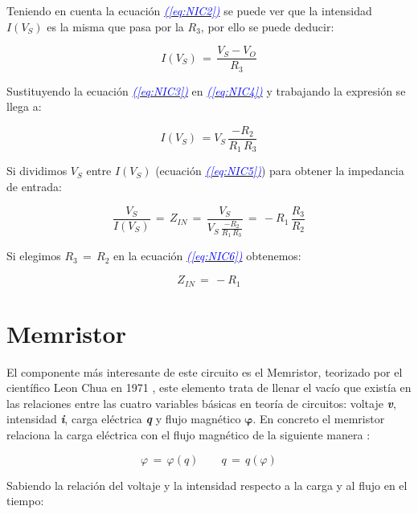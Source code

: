 \documentclass[12pt,a4paper]{report} %
\newcommand{\eref}[1]{\hyperref[#1]{\textcolor{blue}{\textit{(\ref*{#1})}}}}
\begin{document}
	Teniendo en cuenta la ecuación \eref{eq:NIC2} se puede ver que la intensidad $I(V_S)$ es la misma que pasa por la $R_3$, por ello se puede deducir:
	
	\begin{equation}
		I(V_S)\,=\,\frac{V_S - V_O}{R_3}
		\label{eq:NIC4}
	\end{equation}\smallskip
	
	Sustituyendo la ecuación \eref{eq:NIC3} en \eref{eq:NIC4} y trabajando la expresión se llega a:
	
	\begin{equation}
		I(V_S)\,=V_S\,\frac{-R_2}{R_1 \, R_3}
		\label{eq:NIC5}
	\end{equation}\smallskip
	
	Si dividimos $V_S$ entre $I(V_S)$ (ecuación \eref{eq:NIC5}) para obtener la impedancia de entrada:
	
	\begin{equation}
		\frac{V_S}{I(V_S)}\,=\,Z_{IN}\,=\,\frac{V_S}{V_S\,\frac{-R_2}{R_1 \, R_3}}\,=\,-R_1\,\frac{R_3}{R_2}
		\label{eq:NIC6}
	\end{equation}\smallskip
	
	Si elegimos $R_3\,=\,R_2$ en la ecuación \eref{eq:NIC6} obtenemos:
	
	\begin{equation}
		Z_{IN}\,=\,-R_1
		\label{eq:NIC7}
	\end{equation}\smallskip
	
	\newpage
	\section{Memristor}
	El componente más interesante de este circuito es el Memristor, teorizado por el científico Leon Chua en 1971 \cite{chuamissing1971}, este elemento trata de llenar el vacío que existía en las relaciones entre las cuatro variables básicas en teoría de circuitos: voltaje \textbf{\textit{v}}, intensidad \textbf{\textit{i}}, carga eléctrica \textbf{\textit{q}} y flujo magnético \textit{$\bm{\varphi}$}. En concreto el memristor relaciona la carga eléctrica con el flujo magnético de la siguiente manera \cite{chuaoscillator2008}:
	
	\begin{equation}
		\varphi\,=\,\varphi(q) \qquad q\,=\,q(\varphi)
		\label{eq:flujocarga}
	\end{equation}\smallskip
	
	Sabiendo la relación del voltaje y la intensidad respecto a la carga y al flujo en el tiempo:
\end{document}
